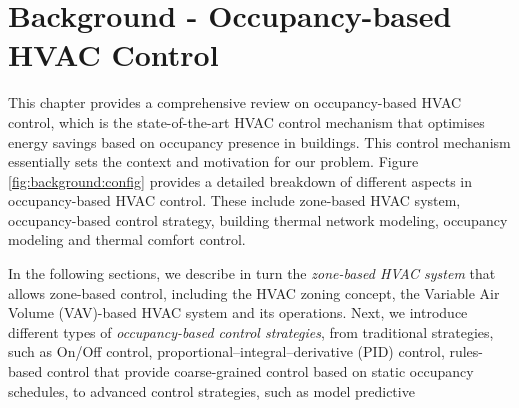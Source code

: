 \chapter{Background - Occupancy-based HVAC Control}
\label{cha:background}









This chapter provides a comprehensive review on occupancy-based HVAC control, which is the state-of-the-art HVAC control mechanism that optimises energy savings based on occupancy presence in buildings. This control mechanism essentially sets the context and motivation for our problem. Figure \ref{fig:background:config} provides a detailed breakdown of different aspects in occupancy-based HVAC control. These include zone-based HVAC system, occupancy-based control strategy, building thermal network modeling, occupancy modeling and thermal comfort control.

In the following sections, we describe in turn the \emph{zone-based HVAC system} that allows zone-based control, including the HVAC zoning concept, the Variable Air Volume (VAV)-based HVAC system and its operations. Next, we introduce different types of \emph{occupancy-based control strategies}, from traditional strategies, such as On/Off control, proportional–integral–derivative (PID) control, rules-based control that provide coarse-grained control based on static occupancy schedules, to advanced control strategies, such as model predictive  

